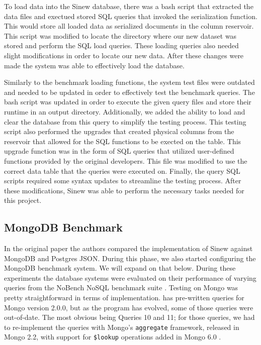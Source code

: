 \documentclass[sigconf]{acmart}
\begin{document}
    To load data into the Sinew database, there was a bash script that extracted the data files and exectued stored SQL queries that invoked the serialization function. This would store all loaded data as serialized documents in the column reservoir. This script was modified to locate the directory where our new dataset was stored and perform the SQL load queries. These loading queries also needed slight modifications in order to locate our new data. After these changes were made the system was able to effectively load the database.

    Similarly to the benchmark loading functions, the system test files were outdated and needed to be updated in order to effectively test the benchmark queries. The bash script was updated in order to execute the given query files and store their runtime in an output directory. Additionally, we added the ability to load and clear the database from this query to simplify the testing process. This testing script also performed the upgrades that created physical columns from the reservoir that allowed for the SQL functions to be exected on the table. This upgrade function was in the form of SQL queries that utilized user-defined functions provided by the original developers. This file was modified to use the correct data table that the queries were executed on. Finally, the query SQL scripts required some syntax updates to streamline the testing process. After these modifications, Sinew was able to perform the necessary tasks needed for this project.

    \subsection{MongoDB Benchmark}
    In the original paper the authors compared the implementation of Sinew against MongoDB and Postgres JSON. During this phase, we also started configuring the MongoDB benchmark system. We will expand on that below. During these experiments the database systems were evaluated on their performance of varying queries from the NoBench NoSQL benchmark suite \cite{NoSQLBench}. Testing on Mongo was pretty straightforward in terms of implementation. \cite{NoSQLBench} has pre-written queries for Mongo version 2.0.0, but as the program has evolved, some of those queries were out-of-date. The most obvious being Queries 10 and 11; for those queries, we had to re-implement the queries with Mongo's \texttt{aggregate} framework, released in Mongo 2.2, with support for \texttt{\$lookup} operations added in Mongo 6.0  \cite{Done2023}.
\end{document}
